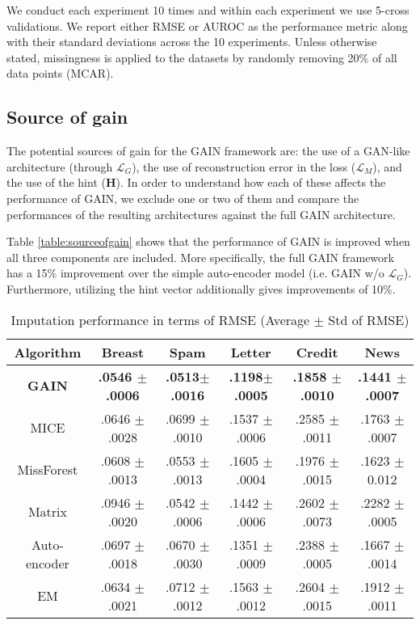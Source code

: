 \documentclass{article}
\begin{document}
We conduct each experiment 10 times and within each experiment we use 5-cross validations. We report either RMSE or AUROC as the performance metric along with their standard deviations across the 10 experiments. Unless otherwise stated, missingness is applied to the datasets by randomly removing 20\% of all data points (MCAR).

\subsection{Source of gain}
The potential sources of gain for the GAIN framework are: the use of a GAN-like architecture (through $\mathcal{L}_G$), the use of reconstruction error in the loss ($\mathcal{L}_M$), and the use of the hint ($\mathbf{H}$). In order to understand how each of these affects the performance of GAIN, we exclude one or two of them and compare the performances of the resulting architectures against the full GAIN architecture.

Table \ref{table:sourceofgain} shows that the performance of GAIN is improved when all three components are included. More specifically, the full GAIN framework has a 15\% improvement over the simple auto-encoder model (i.e. GAIN w/o $\mathcal{L}_G$). Furthermore, utilizing the hint vector additionally gives improvements of 10\%.


    \begin{table*}[t!]
        \renewcommand{\arraystretch}{1.3}
        \caption{Imputation performance in terms of RMSE (Average $\pm$ Std of RMSE)}    
        \label{table:impute}
        \centering
        \begin{tabular}{ |c|| c | c  |  c| c | c |   }
            \toprule
            \textbf{Algorithm}    & \textbf{Breast} &  \textbf{Spam} & \textbf{Letter}& \textbf{Credit} & \textbf{News}   \\ \midrule
            \textbf{GAIN} & \textbf{.0546 $\pm$ .0006} & \textbf{.0513$\pm$ .0016} & \textbf{.1198$\pm$ .0005}  & \textbf{.1858 $\pm$ .0010} & \textbf{.1441 $\pm$ .0007}  \\  \midrule
            MICE  & .0646 $\pm$ .0028 & .0699 $\pm$ .0010 & .1537 $\pm$ .0006  & .2585 $\pm$ .0011 & .1763 $\pm$ .0007  \\ 
            MissForest  & .0608 $\pm$ .0013 & .0553 $\pm$ .0013 & .1605 $\pm$ .0004  & .1976 $\pm$ .0015 & .1623 $\pm$ 0.012
             \\ 
            Matrix  & .0946 $\pm$ .0020 & .0542 $\pm$ .0006 & .1442 $\pm$ .0006  & .2602 $\pm$ .0073 & .2282 $\pm$ .0005 \\
            Auto-encoder  & .0697 $\pm$ .0018 & .0670 $\pm$ .0030 & .1351 $\pm$ .0009  & .2388 $\pm$ .0005 & .1667 $\pm$ .0014   \\
            EM & .0634 $\pm$ .0021 & .0712 $\pm$ .0012 & .1563 $\pm$ .0012  & .2604 $\pm$ .0015 & .1912 $\pm$ .0011   \\ \bottomrule
        \end{tabular}
    \end{table*}
    
\end{document}
